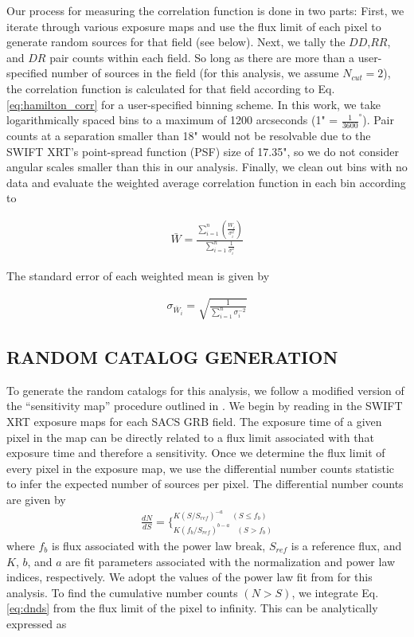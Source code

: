 \documentclass[preprint]{aastex63}
\begin{document}
Our process for measuring the correlation function is done in two parts: First, we
iterate through various exposure maps and use the flux limit of each pixel to generate random
sources for that field (see below). Next, we tally the  $DD$,$RR$, and $DR$ pair counts within each field. So long as there are more than a user-specified
number of sources in the field (for this analysis, we assume $N_{cut} =2$), the correlation function is calculated 
for that field according to Eq.\ref{eq:hamilton_corr} for a user-specified binning scheme. In this work, 
we take logarithmically spaced bins to a maximum of 1200 arcseconds (1" = $\frac{1}{3600}^\circ$). Pair counts at a separation smaller than 18" would 
not be resolvable due to the SWIFT XRT's point-spread function (PSF) size of 17.35", so we do not consider angular scales smaller than this in
our analysis. Finally, we clean out bins with no data and evaluate
the weighted average correlation function in each bin according to 

\begin{align}
    \label{eq:weight_avg}
    \bar W = \frac{\sum_{i=1}^n\left(\frac{W_i}{\sigma^2_i}\right)}{\sum_{i=1}^{n}\frac{1}{\sigma_i^2}}
\end{align}

The standard error of each weighted mean is given by 

\begin{align}
    \label{eq:weight_err}
     \sigma_{\bar W_i} = \sqrt{\frac{1}{\sum_{i=1}^{n}\sigma_i^{-2}}}
\end{align}




\subsection{RANDOM CATALOG GENERATION}
To generate the random catalogs for this analysis, we follow a modified version
 of the ``sensitivity map'' procedure outlined in \cite{koutoulidis_2}.
We begin by reading in the SWIFT XRT exposure maps for each SACS GRB field. The exposure time of a given pixel in the map can be directly related to a flux limit associated
with that exposure time and therefore a sensitivity. Once we determine the flux limit of every pixel in the exposure map, we use the
differential number counts statistic to infer the expected number of sources per pixel. The differential number counts
are given by 
\begin{align}
    \label{eq:dnds}
    \frac{dN}{dS} = \bigg\{^{K(S/S_{ref})^{-a} \ \  \ \ \ (S \leq f_b)}_{K(f_b/S_{ref})^{b-a} \ \ \ \ (S > f_b)}
\end{align}
where $f_b$ is flux associated with the power law break, $S_{ref}$ is a reference flux, 
and $K$, $b$, and $a$ are fit parameters associated with the normalization and power law indices, respectively.
We adopt the values  of the power law fit from \cite{dai_2015} for this analysis. To find the cumulative number counts $(N>S)$, we 
integrate Eq. \ref{eq:dnds} from the flux limit of the pixel to infinity. This can be analytically expressed as
\end{document}
